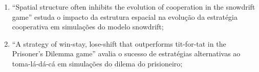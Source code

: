 \begin{enumerate}
    \item ``Spatial structure often inhibits the evolution of cooperation in the snowdrift game'' estuda o impacto da estrutura espacial na evolução da estratégia cooperativa em simulações do modelo snowdrift;%
\item ``A strategy of win-stay, lose-shift that outperforms tit-for-tat in the Prisoner's Dilemma game'' avalia o sucesso de estratégias alternativas ao toma-lá-dá-cá em simulações do dilema do prisioneiro;%

\end{enumerate}
